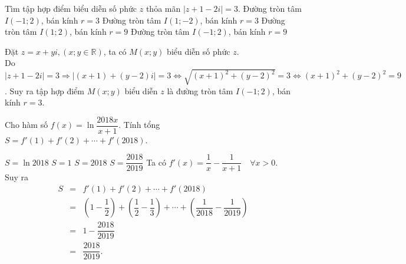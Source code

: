 \begin{ex}%
	Tìm tập hợp điểm biểu diễn số phức $z$ thỏa mãn $|z+1-2i|=3.$
	\choice
	{\True Đường tròn tâm $I(-1;2)$, bán kính $r=3$}
	{Đường tròn tâm $I(1;-2)$, bán kính $r=3$}
	{Đường tròn tâm $I(1;2)$, bán kính $r=9$}
	{Đường tròn tâm $I(-1;2)$, bán kính $r=9$}
	\loigiai
	{ Đặt $z=x+yi, (x;y \in \mathbb{R})$, ta có $M(x;y)$ biểu diễn số phức $z$.\\
	Do $|z+1-2i|=3 \Rightarrow |(x+1) +(y-2)i|= 3 \Leftrightarrow  \sqrt{(x+1)^2+(y-2)^2}=3 \Leftrightarrow (x+1)^2+(y-2)^2=9$. Suy ra tập hợp điểm $M(x;y)$ biểu diễn $z$ là đường tròn tâm $I(-1;2)$, bán kính $r=3$.
		
	}
\end{ex}

\begin{ex}%
	Cho hàm số $f(x)=\ln \dfrac{2018x}{x+1}$. Tính tổng $S=f'(1)+f'(2) +\cdots +f'(2018)$.
	
	\choice
	{$S=\ln 2018$}
	{$S=1$}
	{$S=2018$}
	{\True $S=\dfrac{2018}{2019}$}
	\loigiai
	{ Ta có $f'(x)= \dfrac{1}{x} -\dfrac{1}{x+1} \quad \forall x >0$.\\
		Suy ra 
		\begin{eqnarray*}
			S&=&f'(1)+f'(2) +\cdots +f'(2018)\\
			&= & \left( 1 -\dfrac{1}{2}\right)+ \left( \dfrac{1}{2}- \dfrac{1}{3}\right)+ \cdots + \left( \dfrac{1}{2018}  -\dfrac{1}{2019}\right)\\
			&= &  1 -\dfrac{2018}{2019}\\
			& = &\dfrac{2018}{2019}.
		\end{eqnarray*}	
	}
\end{ex}

